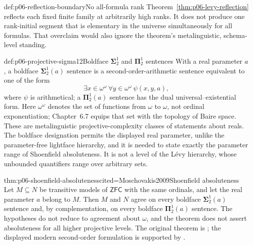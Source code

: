 \begin{proofboundary}{def:p06-reflection-boundary}{No all-formula rank}
Theorem~\ref{thm:p06-levy-reflection} reflects each fixed finite family at
arbitrarily high ranks.  It does not produce one rank-initial segment that is
elementary in the universe simultaneously for all formulas.  That overclaim would
also ignore the theorem's metalinguistic, schema-level standing.
\end{proofboundary}

\begin{hbdefinition}{def:p06-projective-sigma12}{Boldface \(\boldsymbol\Sigma^1_2\) and \(\boldsymbol\Pi^1_2\) sentences}
With a real parameter \(a\), a boldface \(\boldsymbol\Sigma^1_2(a)\) sentence
is a second-order-arithmetic sentence equivalent to one of the form
\[
  \exists x\in\omega^\omega\,
  \forall y\in\omega^\omega\,
  \psi(x,y,a),
\]
where \(\psi\) is arithmetical; a
\(\boldsymbol\Pi^1_2(a)\) sentence has the dual universal--existential form.
Here \(\omega^\omega\) denotes the set of functions from \(\omega\) to
\(\omega\), not ordinal exponentiation; Chapter~6.7 equips that set with the
topology of Baire space.
These are metalinguistic projective-complexity classes of statements about
reals.  The boldface designation permits the displayed real parameter, unlike
the parameter-free lightface hierarchy, and it is needed to state exactly the
parameter range of Shoenfield absoluteness.  It is not a level of the L\'evy
hierarchy, whose unbounded quantifiers range over arbitrary sets.
\end{hbdefinition}

\begin{hbtheorem}{thm:p06-shoenfield-absoluteness}{cited=Moschovakis2009}{Shoenfield absoluteness}
Let \(M\subseteq N\) be transitive models of \(\mathsf{ZFC}\) with the same
ordinals, and let the real parameter \(a\) belong to \(M\).  Then \(M\) and
\(N\) agree on every boldface \(\boldsymbol\Sigma^1_2(a)\) sentence and,
by complementation, on every boldface \(\boldsymbol\Pi^1_2(a)\) sentence.
The hypotheses do not reduce to agreement about \(\omega\), and the theorem
does not assert absoluteness for all higher projective levels.
The original theorem is \cite{Shoenfield1961}; the displayed modern
second-order formulation is supported by \cite{Moschovakis2009}.
\end{hbtheorem}

